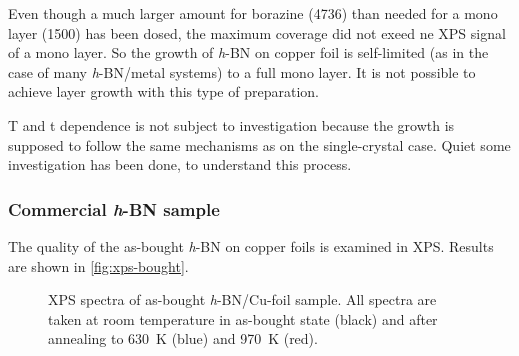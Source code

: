 Even though a much larger amount for borazine (\SI{4736}{\langmuir}) than needed for a mono layer (\SI{1500}{\langmuir}) has been dosed, the maximum coverage did not exeed ne XPS signal of a mono layer. So the growth of \textit{h}-BN on copper foil is self-limited (as in the case of many \textit{h}-BN/metal systems) to a full mono layer. It is not possible to achieve layer growth with this type of preparation.

T and t dependence is not subject to investigation because the growth is supposed to follow the same mechanisms as on the single-crystal case. Quiet some investigation has been done, \cite{orlando_epitaxial_2012,preobrajenski_monolayer_2007-1} to understand this process.

\subsubsection{Commercial \textit{h}-BN sample}
\label{sec:commercial-hBN-XPS}
The quality of the as-bought \textit{h}-BN on copper foils\cite{_graphene_2014} is examined in XPS. Results are shown in \autoref{fig:xps-bought}.
\begin{figure}[!h]
	\centering
	\caption{XPS spectra of as-bought \textit{h}-BN/Cu-foil sample\cite{_graphene_2014}. All spectra are taken at room temperature in as-bought state (black) and after annealing to \SI{630}{\K} (blue) and \SI{970}{\K} (red).}
	\label{fig:xps-bought}
\end{figure}


